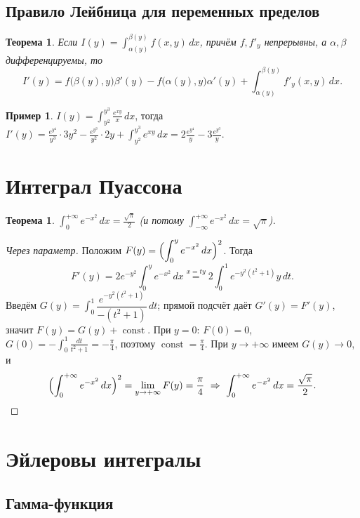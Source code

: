 \documentclass[11pt,a4paper]{article}
\theoremstyle{definition}
\newtheorem{example}[definition]{Пример}
\theoremstyle{plain}
\newtheorem{theorem}[definition]{Теорема}
\DeclareMathOperator{\Const}{const}
\newcommand{\dx}{\,dx}
\begin{document}
\subsection{Правило Лейбница для переменных пределов}

\begin{theorem}
Если $I(y)=\displaystyle\int_{\alpha(y)}^{\beta(y)}f(x,y)\dx$, причём $f,f'_y$ непрерывны, а
$\alpha,\beta$ дифференцируемы, то
\[
  I'(y)=f\bigl(\beta(y),y\bigr)\beta'(y)-f\bigl(\alpha(y),y\bigr)\alpha'(y)
   +\int_{\alpha(y)}^{\beta(y)}f'_y(x,y)\dx .
\]
\end{theorem}

\begin{example}
$\displaystyle I(y)=\int_{y^2}^{y^3}\frac{e^{xy}}{x}\dx$, тогда
$\displaystyle I'(y)=\frac{e^{y^4}}{y^3}\cdot3y^2-\frac{e^{y^3}}{y^2}\cdot2y
+\int_{y^2}^{y^3}e^{xy}\dx=2\frac{e^{y^4}}{y}-3\frac{e^{y^3}}{y}$.
\end{example}

\section{Интеграл Пуассона}

\begin{theorem}
$\displaystyle\int_0^{+\infty}e^{-x^2}\dx=\frac{\sqrt\pi}{2}$ (и потому
$\int_{-\infty}^{+\infty}e^{-x^2}\dx=\sqrt\pi$).
\end{theorem}

\begin{proof}[Через параметр]
Положим $\displaystyle F(y)=\Bigl(\int_0^y e^{-x^2}\dx\Bigr)^2$. Тогда
\[
  F'(y)=2e^{-y^2}\!\int_0^y e^{-x^2}\dx\overset{x=ty}{=}2\int_0^1 e^{-y^2(t^2+1)}y\,dt .
\]
Введём $G(y)=\int_0^1\dfrac{e^{-y^2(t^2+1)}}{-(t^2+1)}\,dt$; прямой подсчёт даёт $G'(y)=F'(y)$,
значит $F(y)=G(y)+\Const$. При $y=0$: $F(0)=0$, $G(0)=-\int_0^1\frac{dt}{t^2+1}=-\frac\pi4$,
поэтому $\Const=\frac\pi4$. При $y\to+\infty$ имеем $G(y)\to0$, и
\[
  \Bigl(\int_0^{+\infty}e^{-x^2}\dx\Bigr)^2=\lim_{y\to+\infty}F(y)=\frac\pi4
  \ \Rightarrow\ \int_0^{+\infty}e^{-x^2}\dx=\frac{\sqrt\pi}{2}.
\]
\end{proof}

\section{Эйлеровы интегралы}

\subsection{Гамма-функция}
\end{document}

